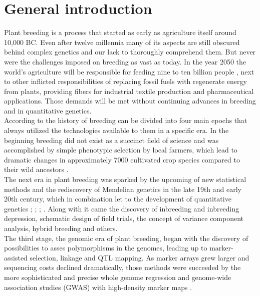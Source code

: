 
\chapter{General introduction} %
\label{Chapter0} %

Plant breeding is a process that started as early as agriculture itself around 10,000
BC. Even after twelve millennia many of its aspects are still obscured behind complex
genetics and our lack to thoroughly comprehend them. But never were the challenges imposed
on breeding as vast as today. In the year 2050 the world's agriculture will be responsible
for feeding nine to ten billion people \cite{gerland2014world}, next to other inflicted
responsibilities of replacing fossil fuels with regenerate energy from plants, providing
fibers for industrial textile production and pharmaceutical applications. Those demands will be met without continuing advances in breeding and in quantitative genetics.  \\
According to \cite{wallace2018road} the history of breeding can be divided into four main
epochs that always utilized the technologies available to them in a specific era. In the
beginning breeding did not exist as a succinct field of science and was accomplished by
simple phenotypic selection by local farmers, which lead to dramatic changes
in approximately 7000 cultivated crop species compared to their wild ancestors \cite{khoury2016origins}.\\
The next era in plant breeding was sparked by the upcoming of new statistical methods and
the rediscovery of Mendelian genetics in the late 19th and early 20th century, which in
combination let to the development of quantitative genetics
\cite{tschermak1900kunstliche}; \cite{fisher1919xv}; \cite{fisher1923};
\cite{falconer1996}. Along with it came the discovery of
inbreeding and inbreeding depression, schematic design of field trials, the concept of variance component analysis, hybrid breeding and others. \\
The third stage, the genomic era of plant breeding, began with the discovery of
possibilities to asses polymorphisms in the genomes, leading up to marker-assisted
selection, linkage and QTL mapping. As marker arrays grew larger and sequencing costs
declined dramatically, those methods were succeeded by the more sophisticated and precise whole genome regression and genome-wide association studies (GWAS) with high-density marker maps \cite{hayes2001,korte2013advantages}. \\
